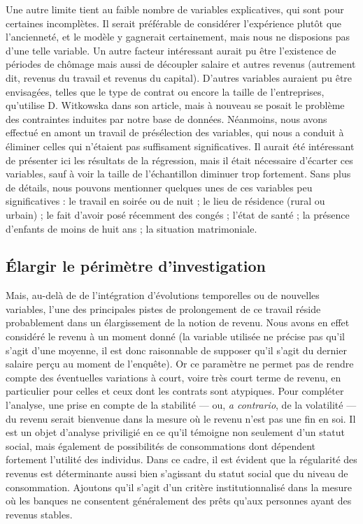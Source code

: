 \documentclass[a4paper, french, 11 pt]{article}\usepackage[]{graphicx}\usepackage[]{xcolor}
\begin{document}
Une autre limite tient au faible nombre de variables explicatives, qui sont pour certaines incomplètes. Il serait préférable de considérer l'expérience plutôt que l'ancienneté, et le modèle y gagnerait certainement, mais nous ne disposions pas d'une telle variable. Un autre facteur intéressant aurait pu être l'existence de périodes de chômage mais aussi de découpler salaire et autres revenus (autrement dit, revenus du travail et revenus du capital).  D'autres variables auraient pu être envisagées, telles que le type de contrat ou encore la taille de l'entreprises, qu'utilise D. Witkowska dans son article, mais à nouveau se posait le problème des contraintes induites par notre base de données. Néanmoins, nous avons effectué en amont un travail de présélection des variables, qui nous a conduit à éliminer celles qui n'étaient pas suffisament significatives. Il aurait été intéressant de présenter ici les résultats de la régression, mais il était nécessaire d'écarter ces variables, sauf à voir la taille de l'échantillon diminuer trop fortement. Sans plus de détails, nous pouvons mentionner quelques unes de ces variables peu significatives : le travail en soirée ou de nuit ; le lieu de résidence (rural ou urbain) ; le fait d'avoir posé récemment des congés ; l'état de santé ; la présence d'enfants de moins de huit ans ; la situation matrimoniale.  



\subsection{Élargir le périmètre d'investigation}

Mais, au-delà de de l'intégration d'évolutions temporelles ou de nouvelles variables, l'une des principales pistes de prolongement de ce travail réside probablement dans un élargissement de la notion de revenu. Nous avons en effet considéré le revenu à un moment donné (la variable utilisée ne précise pas qu'il s'agit d'une moyenne, il est donc raisonnable de supposer qu'il s'agit du dernier salaire perçu au moment de l'enquête). Or ce paramètre ne permet pas de rendre compte des éventuelles variations à court, voire très court terme de revenu, en particulier pour celles et ceux dont les contrats sont atypiques. Pour compléter l'analyse, une prise en compte de la stabilité --- ou, \textit{a contrario}, de la volatilité --- du revenu serait bienvenue dans la mesure où le revenu n'est pas une fin en soi. Il est un objet d'analyse priviligié en ce qu'il témoigne non seulement d'un statut social, mais également de possibilités de consommations dont dépendent fortement l'utilité des individus. Dans ce cadre, il est évident que la régularité des revenus est déterminante aussi bien s'agissant du statut social que du niveau de consommation. Ajoutons qu'il s'agit d'un critère institutionnalisé dans la mesure où les banques ne consentent généralement des prêts qu'aux personnes ayant des revenus stables. 
\end{document}
